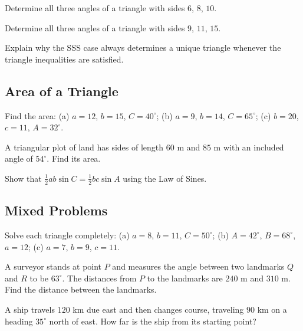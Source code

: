 \begin{exercise}
Determine all three angles of a triangle with sides $6$, $8$, $10$.
\end{exercise}

\begin{exercise}
Determine all three angles of a triangle with sides $9$, $11$, $15$.
\end{exercise}

\begin{exercise}
Explain why the SSS case always determines a unique triangle whenever the
triangle inequalities are satisfied.
\end{exercise}

\subsection*{Area of a Triangle}
\begin{exercise}
Find the area: (a) $a=12$, $b=15$, $C=40^\circ$; (b) $a=9$, $b=14$,
$C=65^\circ$; (c) $b=20$, $c=11$, $A=32^\circ$.
\end{exercise}

\begin{exercise}
A triangular plot of land has sides of length $60$ m and $85$ m with an
included angle of $54^\circ$. Find its area.
\end{exercise}

\begin{exercise}
Show that $\tfrac12 ab\sin C = \tfrac12 bc\sin A$ using the Law of Sines.
\end{exercise}

\subsection*{Mixed Problems}
\begin{exercise}
Solve each triangle completely: (a) $a=8$, $b=11$, $C=50^\circ$; (b)
$A=42^\circ$, $B=68^\circ$, $a=12$; (c) $a=7$, $b=9$, $c=11$.
\end{exercise}

\begin{exercise}
A surveyor stands at point $P$ and measures the angle between two
landmarks $Q$ and $R$ to be $63^\circ$. The distances from $P$ to the
landmarks are $240$ m and $310$ m. Find the distance between the
landmarks.
\end{exercise}

\begin{exercise}
A ship travels $120$ km due east and then changes course, traveling $90$
km on a heading $35^\circ$ north of east. How far is the ship from its
starting point?
\end{exercise}

